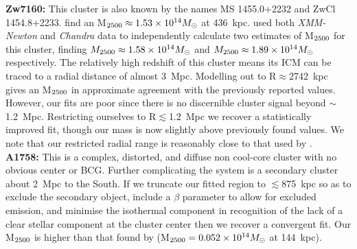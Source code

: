 \documentclass[twocolumn]{aastex6}
\begin{document}
{\bf Zw7160:} This cluster is also known by the names MS 1455.0+2232 and ZwCl 1454.8+2233.  \citet[][]{Comis11} find an M$_{\rm 2500} \approx 1.53\times10^{14}M_{\odot}$ at 436~kpc.  \citet[][]{Martino14} used both {\it XMM-Newton} and {\it Chandra} data to independently calculate two estimates of M$_{\rm 2500}$ for this cluster, finding $M_{\rm 2500} \approx 1.58 \times10^{14} M_{\odot}$ and $M_{\rm 2500} \approx 1.89 \times10^{14} M_{\odot}$ respectively.  The relatively high redshift of this cluster means its ICM can be traced to a radial distance of almost 3~Mpc.  Modelling out to R$\approx$2742~kpc gives an M$_{\rm 2500}$ in approximate agreement with the previously reported values.  However, our fits are poor since there is no discernible cluster signal beyond $\sim$1.2~Mpc. Restricting ourselves to R$\lesssim$1.2~Mpc we recover a statistically improved fit, though our mass is now slightly above previously found values.  We note that our restricted radial range is reasonably close to that used by \citet[][]{Martino14}. \\
{\bf A1758:} This is a complex, distorted, and diffuse non cool-core cluster with no obvious center or BCG.  Further complicating the system is a secondary cluster about 2~Mpc to the South.  If we truncate our fitted region to $\lesssim$875~kpc so as to exclude the secondary object, include a $\beta$ parameter to allow for excluded emission, and minimise the isothermal component in recognition of the lack of a clear stellar component at the cluster center then we recover a convergent fit.  Our M$_{\rm 2500}$ is higher than that found by \citet[][]{Comis11} (M$_{\rm 2500} = 0.052\times10^{14}M_{\odot}$ at 144~kpc). \\



\end{document}
